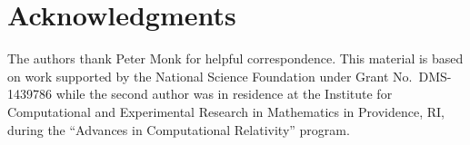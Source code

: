 \documentclass[journal,transmag]{IEEEtran}
\begin{document}
\section*{Acknowledgments}
The authors thank Peter Monk for helpful correspondence.
This material is based on work supported by the National Science Foundation under Grant No.\ DMS-1439786 while the second author was in residence at the Institute for Computational and Experimental Research in Mathematics in Providence, RI, during the ``Advances in Computational Relativity'' program.
\end{document}
